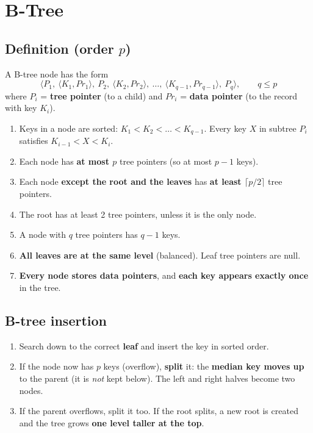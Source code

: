 \documentclass[10pt,a4paper]{article}
\begin{document}
\section{B-Tree}

\subsection{Definition (order $p$)}
A B-tree node has the form
\[
\langle P_1,\ \langle K_1, Pr_1\rangle,\ P_2,\ \langle K_2, Pr_2\rangle,\ \dots,\ \langle K_{q-1}, Pr_{q-1}\rangle,\ P_q \rangle, \qquad q \le p
\]
where $P_i$ = \textbf{tree pointer} (to a child) and $Pr_i$ = \textbf{data pointer} (to the record with key $K_i$).

\begin{keybox}
\begin{enumerate}
  \item Keys in a node are sorted: $K_1 < K_2 < \dots < K_{q-1}$. Every key $X$ in subtree $P_i$ satisfies $K_{i-1} < X < K_i$.
  \item Each node has \textbf{at most $p$} tree pointers (so at most $p-1$ keys).
  \item Each node \textbf{except the root and the leaves} has \textbf{at least $\lceil p/2 \rceil$} tree pointers.
  \item The root has at least 2 tree pointers, unless it is the only node.
  \item A node with $q$ tree pointers has $q-1$ keys.
  \item \textbf{All leaves are at the same level} (balanced). Leaf tree pointers are null.
  \item \textbf{Every node stores data pointers}, and \textbf{each key appears exactly once} in the tree.
\end{enumerate}
\end{keybox}

\subsection{B-tree insertion}
\begin{enumerate}
  \item Search down to the correct \textbf{leaf} and insert the key in sorted order.
  \item If the node now has $p$ keys (overflow), \textbf{split} it: the \textbf{median key moves up} to the parent (it is \emph{not} kept below). The left and right halves become two nodes.
  \item If the parent overflows, split it too. If the root splits, a new root is created and the tree grows \textbf{one level taller at the top}.
\end{enumerate}
\end{document}
